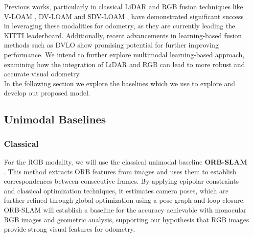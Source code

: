 \documentclass[11pt,a4paper]{article}
\begin{document}
Previous works, particularly in classical LiDAR and RGB fusion techniques like V-LOAM \cite{vloam}, DV-LOAM \cite{dv-loam} and SDV-LOAM \cite{sdv-loam}, have demonstrated significant success in leveraging these modalities for odometry, as they are currently leading the KITTI leaderboard. Additionally, recent advancements in learning-based fusion methods such as DVLO \cite{dvlo} show promising potential for further improving performance. We intend to further explore multimodal learning-based approach, examining how the integration of LiDAR and RGB can lead to more robust and accurate visual odometry.\\

In the following section we explore the baselines which we use to explore and develop out proposed model.




\subsection{Unimodal Baselines}
\subsubsection{Classical}



For the RGB modality, we will use the classical unimodal baseline \textbf{ORB-SLAM} \cite{orb-slam}. This method extracts ORB features from images and uses them to establish correspondences between consecutive frames. By applying epipolar constraints and classical optimization techniques, it estimates camera poses, which are further refined through global optimization using a pose graph and loop closure. ORB-SLAM will establish a baseline for the accuracy achievable with monocular RGB images and geometric analysis, supporting our hypothesis that RGB images provide strong visual features for odometry.
\end{document}

